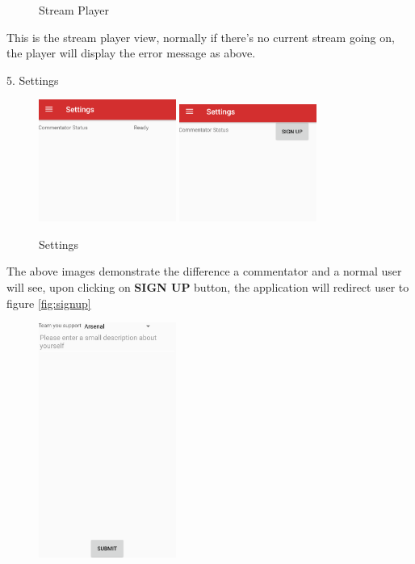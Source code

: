 \documentclass{article}
\begin{document}
\begin{flushleft}
\begin{figure}[H]
	\caption{Stream Player}
	\label{fig:player}
\end{figure}
This is the stream player view, normally if there's no current stream going on, the player will display the error message as above.\par
{\large 5. Settings}\par
\begin{figure}[H]
	\includegraphics[width=0.40\textwidth]{settings}
	\hfill
	\includegraphics[width=0.40\textwidth]{settings2}
	\caption{Settings}
	\label{fig:settings}
\end{figure}
The above images demonstrate the difference a commentator and a normal user will see, upon clicking on \textbf{SIGN UP} button, the application will redirect user to figure \ref{fig:signup}
\begin{figure}[H]
	\centering
	\includegraphics[width=0.40\textwidth]{signup}

\end{figure}
\end{flushleft}
\end{document}
